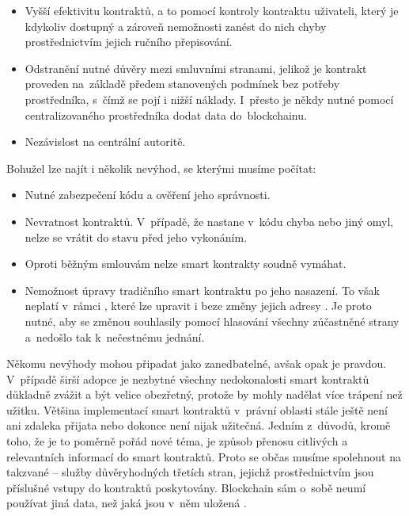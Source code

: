 \begin{itemize}
    \item Vyšší efektivitu kontraktů, a to pomocí kontroly kontraktu uživateli, který je kdykoliv dostupný a zároveň nemožnosti zanést do nich chyby prostřednictvím jejich ručního přepisování.
    \item Odstranění nutné důvěry mezi smluvními stranami, jelikož je kontrakt proveden na~základě předem stanovených podmínek bez potřeby prostředníka, s~čímž se pojí i nižší náklady. I~přesto je někdy nutné pomocí centralizovaného prostředníka dodat data do~blockchainu.
    \item Nezávislost na centrální autoritě.
\end{itemize}

Bohužel lze najít i několik nevýhod, se kterými musíme počítat:

\begin{itemize}
    \item Nutné zabezpečení kódu a ověření jeho správnosti. 
    \item Nevratnost kontraktů. V~případě, že nastane v~kódu chyba nebo jiný omyl, nelze se vrátit do stavu před jeho vykonáním.
    \item Oproti běžným smlouvám nelze smart kontrakty soudně vymáhat. 
    \item Nemožnost úpravy tradičního smart kontraktu po jeho nasazení. To však neplatí v~rámci , které lze upravit i beze změny jejich adresy \cite{upgradable}. Je proto nutné, aby se změnou souhlasily pomocí hlasování všechny zúčastněné strany a~nedošlo tak k~nečestnému jednání.
\end{itemize}

Někomu nevýhody mohou připadat jako zanedbatelné, avšak opak je pravdou. V~případě širší adopce je nezbytné všechny nedokonalosti smart kontraktů důkladně zvážit a být velice obezřetný, protože by mohly nadělat více trápení než užitku. Většina implementací smart kontraktů v~právní oblasti stále ještě není ani zdaleka přijata nebo dokonce není nijak užitečná. Jedním z~důvodů, kromě toho, že je to poměrně pořád nové téma, je způsob přenosu citlivých a relevantních informací do smart kontraktů. Proto se občas musíme spolehnout na takzvané  -- služby důvěryhodných třetích stran, jejichž prostřednictvím jsou příslušné vstupy do kontraktů poskytovány. Blockchain sám o~sobě neumí používat jiná data, než jaká jsou v~něm uložená \cite{fintech}.

